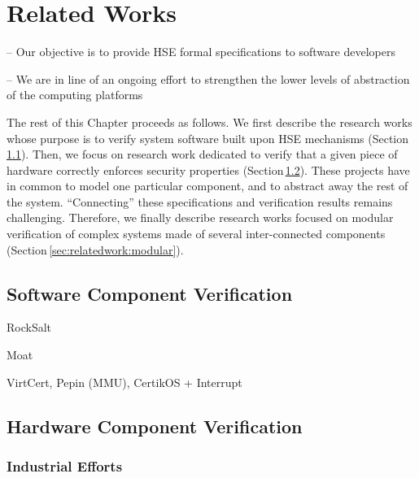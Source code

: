 \chapter{Related Works}
\label{chapter:relatedwork}

\begin{compactitem}
\item[--] Our objective is to provide HSE formal specifications to software
  developers
\item[--] We are in line of an ongoing effort to strengthen the lower levels of
  abstraction of the computing
  platforms\,\cite{potlapally2011hardwaresecurity,chong2016report}
\end{compactitem}

The rest of this Chapter proceeds as follows.
%
We first describe the research works whose purpose is to verify system software
built upon HSE mechanisms (Section\,\ref{sec:relatedwork:software}).
%
Then, we focus on research work dedicated to verify that a given piece of
hardware correctly enforces security properties
(Section\,\ref{sec:relatedwork:hardware}).
%
These projects have in common to model one particular component, and to abstract
away the rest of the system.
%
``Connecting'' these specifications and verification results remains
challenging.
%
Therefore, we finally describe research works focused on modular verification of
complex systems made of several inter-connected components
(Section\,\ref{sec:relatedwork:modular}).

\section{Software Component Verification} %
\label{sec:relatedwork:software}

\begin{compactitem}
\item RockSalt\,\cite{morrisett2012rocksalt}
\item Moat\,\cite{sinha2015moat}
\item VirtCert, Pepin (MMU), CertikOS + Interrupt
\end{compactitem}


\section{Hardware Component Verification} %
\label{sec:relatedwork:hardware}

\subsection{Industrial Efforts} %

